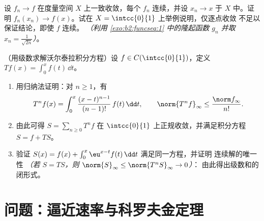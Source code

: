 \begin{exercise}[$\star\star$]\label{exo:b2:funcseq:11}
设 $f_n \to f$ 在度量空间 $X$ 上一致收敛，每个 $f_n$
连续，并设 $x_n \to x$ 于 $X$ 中。证明 $f_n(x_n) \to
f(x)$。试在 $X = \intcc{0}{1}$ 上举例说明，仅逐点收敛
不足以保证结论，即使 $f$ 连续。
\emph{（利用 \cref{exo:b2:funcseq:1} 中的隆起函数 $g_n$ 并取 $x_n =
\frac{1}{\sqrt{2n}}$）}。
\end{exercise}

\begin{exercise}[$\star\star\star$]\label{exo:b2:funcseq:12}
（用级数求解沃尔泰拉积分方程）设 $f \in
C(\intcc{0}{1})$，定义 $Tf(x) = \int_0^x f(t)\,\dd t$。
\begin{enumerate}
  \item 用归纳法证明：对 $n \geq 1$，有
        \[
        T^n f(x) = \int_0^x \frac{(x -
        t)^{n-1}}{(n-1)!}\,f(t)\,\dd t,
        \qquad
        \norm{T^n f}_\infty \leq \frac{\norm f_\infty}{n!} .
        \]
  \item 由此可得 $S = \sum_{n\geq0} T^n f$ 在
        $\intcc{0}{1}$ 上正规收敛，并满足积分方程 $S = f
        + TS$。
  \item 验证 $S(x) = f(x) + \int_0^x \eu^{x-t}f(t)\,\dd
        t$ 满足同一方程，并证明
        连续解的唯一性 \emph{（若 $S = TS$，则
        $\norm{S}_\infty \leq \norm{T^nS}_\infty \to 0$）}：
        由此得出级数和的闭形式。
\end{enumerate}
\end{exercise}

\section{问题：逼近速率与科罗夫金定理}

